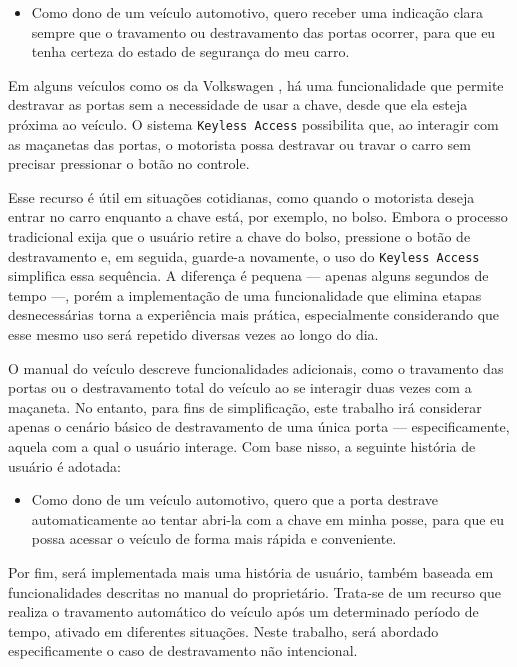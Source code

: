 \begin{itemize}
    \item Como dono de um veículo automotivo, quero receber uma indicação clara sempre que o travamento ou destravamento das portas ocorrer, para que eu tenha certeza do estado de segurança do meu carro.
\end{itemize}

Em alguns veículos como os da Volkswagen \cite{vwLocking}, há uma funcionalidade que permite destravar as portas sem a necessidade de usar a chave, desde que ela 
esteja próxima ao veículo. O sistema \texttt{Keyless Access} possibilita que, ao interagir com as maçanetas das portas, o motorista possa destravar ou travar o carro sem 
precisar pressionar o botão no controle.

Esse recurso é útil em situações cotidianas, como quando o motorista deseja entrar no carro enquanto a chave está, por exemplo, no bolso. Embora o processo 
tradicional exija que o usuário retire a chave do bolso, pressione o botão de destravamento e, em seguida, guarde-a novamente, o uso do \texttt{Keyless Access} simplifica 
essa sequência. A diferença é pequena — apenas alguns segundos de tempo —, porém a implementação de uma funcionalidade que elimina etapas desnecessárias torna a 
experiência mais prática, especialmente considerando que esse mesmo uso será repetido diversas vezes ao longo do dia.

O manual do veículo descreve funcionalidades adicionais, como o travamento das portas ou o destravamento total do veículo ao se interagir duas vezes com a maçaneta. 
No entanto, para fins de simplificação, este trabalho irá considerar apenas o cenário básico de destravamento de uma única porta — especificamente, aquela com a 
qual o usuário interage. Com base nisso, a seguinte história de usuário é adotada:

\begin{itemize}
    \item Como dono de um veículo automotivo, quero que a porta destrave automaticamente ao tentar abri-la com a chave em minha posse, para que eu possa acessar o veículo de forma mais rápida e conveniente.
\end{itemize}

Por fim, será implementada mais uma história de usuário, também baseada em funcionalidades descritas no manual do proprietário. Trata-se de um recurso que realiza o 
travamento automático do veículo após um determinado período de tempo, ativado em diferentes situações. Neste trabalho, será abordado especificamente o caso de 
destravamento não intencional.

